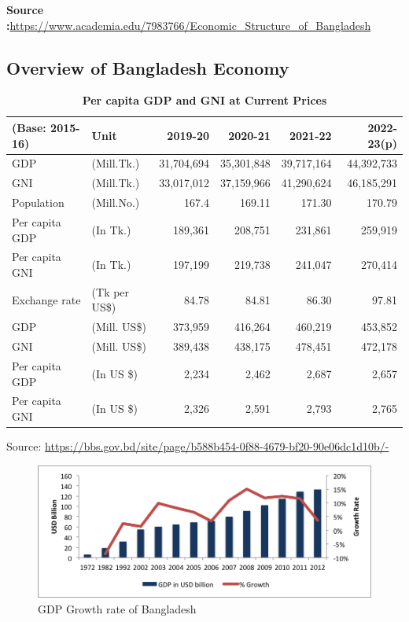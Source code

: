 \textbf{Source :}\url{https://www.academia.edu/7983766/Economic_Structure_of_Bangladesh}

\subsection{Overview of Bangladesh Economy}

\begin{table}[h!]
\renewcommand{\arraystretch}{1.7} %
\caption{\textbf{Per capita GDP and GNI at Current Prices}}
\label{table:1}
\begin{tabular}{l l r r r r}
	\bottomrule
	\rowcolor{gray!30}
	\textbf{(Base: 2015-16)} & Unit & 2019-20 & 2020-21 & 2021-22 & 2022-23(p)\\
	\toprule
	GDP 				& (Mill.Tk.) 	& 31,704,694		& 35,301,848 	& 39,717,164 	& 44,392,733 \\
	GNI 				& (Mill.Tk.) 	& 33,017,012		& 37,159,966 	& 41,290,624 	& 46,185,291 \\
	Population 		& (Mill.No.) 	& 167.4 			& 169.11 		& 171.30 		& 170.79 \\
	Per capita GDP 	& (In Tk.) 		& 189,361 		& 208,751 		& 231,861 		& 259,919 \\
	Per capita GNI 	& (In Tk.) 		& 197,199 		& 219,738 		& 241,047 		& 270,414 \\
	Exchange rate 	& (Tk per US\$)	& 84.78 			& 84.81 			& 86.30 			& 97.81 \\
	GDP				& (Mill. US\$) 	& 373,959 		& 416,264 		& 460,219 		& 453,852 \\
	GNI 				& (Mill. US\$) 	& 389,438 		& 438,175 		& 478,451 		& 472,178 \\
	Per capita GDP 	& (In US \$) 	& 2,234 			& 2,462 			& 2,687 			& 2,657 \\
	Per capita GNI 	& (In US \$) 	& 2,326 			& 2,591 			& 2,793 			& 2,765 \\
	\bottomrule
\end{tabular}
\end{table}
Source: \url{https://bbs.gov.bd/site/page/b588b454-0f88-4679-bf20-90e06dc1d10b/-}

\newpage
\begin{figure}[h!]
    \centering
    \includegraphics[width=1.00\textwidth]{Figs/GDP.png}
    \caption{ GDP Growth rate of Bangladesh}
    \label{fig:mesh1}
\end{figure}


